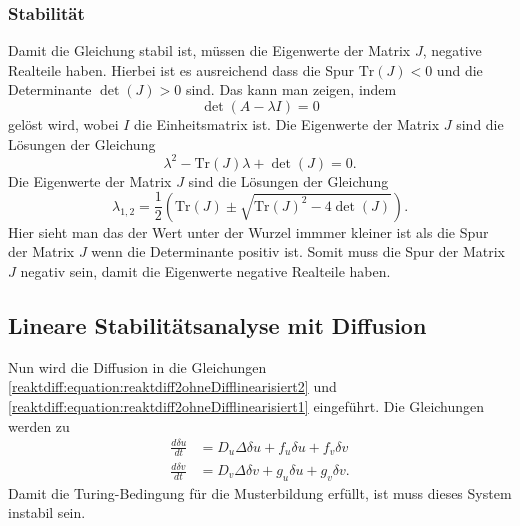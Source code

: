 \subsubsection{Stabilität}
Damit die Gleichung stabil ist, müssen die Eigenwerte der Matrix \(J\), negative Realteile haben.
Hierbei ist es ausreichend dass die Spur \(\text{Tr}(J) < 0\) und die Determinante \(\det(J) > 0\) sind.
Das kann man zeigen, indem
\begin{equation*}
    \det(A - \lambda I) = 0
\end{equation*}
gelöst wird, wobei \(I\) die Einheitsmatrix ist.
Die Eigenwerte der Matrix \(J\) sind die Lösungen der Gleichung
\begin{equation*}
    \lambda^2 - \text{Tr}(J) \lambda + \det(J) = 0.
\label{reaktdiff:equation:reaktdiff2ohneDifflinearisiert3}
\end{equation*}
Die Eigenwerte der Matrix \(J\) sind die Lösungen der Gleichung
\begin{equation*}
    \lambda_{1,2} = \frac{1}{2} \left( \text{Tr}(J) \pm 
    \sqrt{\text{Tr}(J)^2 - 4 \det(J)} \right).
\label{reaktdiff:equation:reaktdiff2ohneDifflinearisiert4}
\end{equation*}
Hier sieht man das der Wert unter der Wurzel immmer kleiner ist als die Spur der Matrix \(J\) wenn die Determinante positiv ist.
Somit muss die Spur der Matrix \(J\) negativ sein, damit die Eigenwerte negative Realteile haben.

\subsection{Lineare Stabilitätsanalyse mit Diffusion
\label{reaktdiff:section:matheDiff}}
Nun wird die Diffusion in die Gleichungen \eqref{reaktdiff:equation:reaktdiff2ohneDifflinearisiert2} und \eqref{reaktdiff:equation:reaktdiff2ohneDifflinearisiert1} eingeführt.
Die Gleichungen werden zu
\begin{align}
    \label{reaktdiff:equation:reaktdiff2mitDiff1}
    \frac{d \delta u}{dt} &= D_u \Delta \delta u + 
    f_u \delta u + f_v \delta v\\
    \label{reaktdiff:equation:reaktdiff2mitDiff2}
    \frac{d \delta v}{dt} &= D_v \Delta \delta v + 
    g_u \delta u + g_v \delta v.
\end{align}
Damit die Turing-Bedingung für die Musterbildung erfüllt, ist muss dieses System instabil sein.

